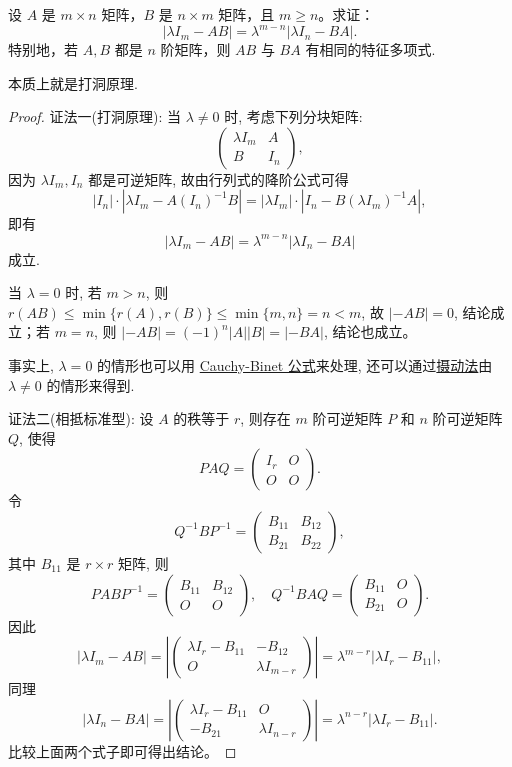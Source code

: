 \documentclass[../../main.tex]{subfiles}
\begin{document}
\begin{theorem}[特征值的降价公式]\label{theorem:特征值的降价公式}
设 \( A \) 是 \( m \times n \) 矩阵，\( B \) 是 \( n \times m \) 矩阵，且 \( m \geqslant  n \)。求证：
\[
|\lambda I_m - AB| = \lambda^{m-n} |\lambda I_n - BA|.
\]
特别地，若 \( A, B \) 都是 \( n \) 阶矩阵，则 \( AB \) 与 \( BA \) 有相同的特征多项式.
\end{theorem}
\begin{note}
本质上就是打洞原理.
\end{note}
\begin{proof}
{\color{blue}证法一(打洞原理):} 当 \(\lambda \neq 0\) 时, 考虑下列分块矩阵:
\[
\begin{pmatrix}
\lambda I_m & A \\
B & I_n
\end{pmatrix},
\]
因为 \(\lambda I_m, I_n\) 都是可逆矩阵, 故由行列式的降阶公式可得
\[
|I_n| \cdot |\lambda I_m - A(I_n)^{-1}B| = |\lambda I_m| \cdot |I_n - B(\lambda I_m)^{-1}A|,
\]
即有
\[
|\lambda I_m - AB| = \lambda^{m-n} |\lambda I_n - BA|
\]
成立.

当 \(\lambda = 0\) 时, 若 \(m > n\), 则 \(r(AB) \leqslant  \min\{r(A), r(B)\} \leqslant  \min\{m, n\} = n < m\), 故 \(|-AB| = 0\), 结论成立；若 \(m = n\), 则 \(|-AB| = (-1)^n |A||B| = |-BA|\), 结论也成立。

事实上, \(\lambda = 0\) 的情形也可以用 \hyperref[theorem:Cauchy-Binet公式]{Cauchy-Binet 公式}来处理, 还可以通过\hyperref[proposition:摄动法基本命题]{摄动法}由 \(\lambda \neq 0\) 的情形来得到.

{\color{blue}证法二(相抵标准型):} 设 \(A\) 的秩等于 \(r\), 则存在 \(m\) 阶可逆矩阵 \(P\) 和 \(n\) 阶可逆矩阵 \(Q\), 使得
\[
PAQ = \begin{pmatrix}
I_r & O \\
O & O
\end{pmatrix}.
\]
令
\[
Q^{-1}BP ^{-1}= \begin{pmatrix}
B_{11} & B_{12} \\
B_{21} & B_{22}
\end{pmatrix},
\]
其中 \(B_{11}\) 是 \(r \times r\) 矩阵, 则
\[
PABP^{-1} = \begin{pmatrix}
B_{11} & B_{12} \\
O & O
\end{pmatrix}, \quad Q^{-1}BAQ = \begin{pmatrix}
B_{11} & O \\
B_{21} & O
\end{pmatrix}.
\]
因此
\[
|\lambda I_m - AB| = \left| \begin{pmatrix}
\lambda I_r - B_{11} & -B_{12} \\
O & \lambda I_{m-r}
\end{pmatrix} \right| = \lambda^{m-r} |\lambda I_r - B_{11}|,
\]
同理
\[
|\lambda I_n - BA| = \left| \begin{pmatrix}
\lambda I_r - B_{11} & O \\
-B_{21} & \lambda I_{n-r}
\end{pmatrix} \right| = \lambda^{n-r} |\lambda I_r - B_{11}|.
\]
比较上面两个式子即可得出结论。


\end{proof}
\end{document}
